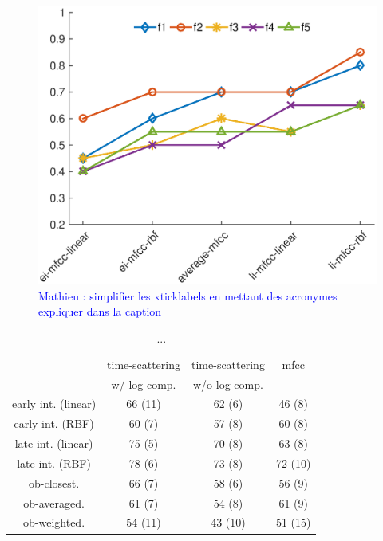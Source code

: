 \documentclass[journal]{IEEEtran}
\newcommand{\ml}[1]{\textcolor{blue}{ Mathieu : #1}}
\begin{document}
\begin{figure}
\begin{center}
\includegraphics[width=\columnwidth]{gfx/supervised_rbf_test2.eps}
\caption{\ml{simplifier les xticklabels en mettant des acronymes expliquer dans la caption}}
\end{center}
\end{figure}

\begin{table}
\begin{center}
\begin{tabular}{cccc}
                    & time-scattering & time-scattering & mfcc \\
                    & w/ log comp.    & w/o log comp.   &      \\
             \hline
early int. (linear)  & 66 (11)        & 62 (6)  & 46 (8)    \\
early int. (RBF)     & 60 (7)         & 57 (8)  & 60 (8)    \\
late int.  (linear)  & 75 (5)         & 70 (8)  & 63 (8)   \\
late int.  (RBF)     & 78 (6)         & 73 (8)  & 72 (10)   \\
ob-closest.          & 66 (7)         & 58 (6)  & 56 (9)   \\
ob-averaged.         & 61 (7)         & 54 (8)  & 61 (9)   \\
ob-weighted.         & 54 (11)        & 43 (10) & 51 (15)   \\
\end{tabular}
\caption{...}
\end{center}
\end{table}
\end{document}
